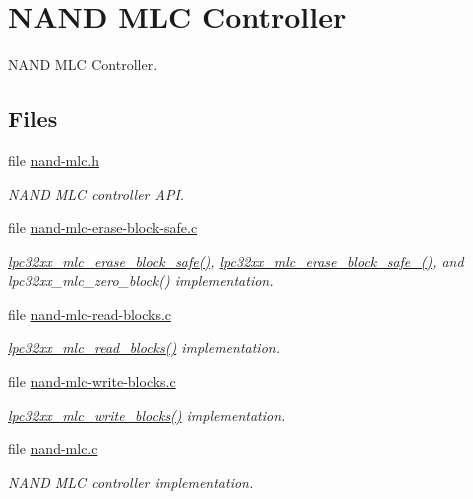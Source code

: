 \hypertarget{group__lpc32xx__nand__mlc}{}\section{N\+A\+ND M\+LC Controller}
\label{group__lpc32xx__nand__mlc}


N\+A\+ND M\+LC Controller.  


\subsection*{Files}
\begin{DoxyCompactItemize}
\item 
file \mbox{\hyperlink{nand-mlc_8h}{nand-\/mlc.\+h}}
\begin{DoxyCompactList}\small\item\em N\+A\+ND M\+LC controller A\+PI. \end{DoxyCompactList}\item 
file \mbox{\hyperlink{nand-mlc-erase-block-safe_8c}{nand-\/mlc-\/erase-\/block-\/safe.\+c}}
\begin{DoxyCompactList}\small\item\em \mbox{\hyperlink{group__lpc32xx__nand__mlc_gab3b2378535527c368dd10f78a4eca68c}{lpc32xx\+\_\+mlc\+\_\+erase\+\_\+block\+\_\+safe()}}, \mbox{\hyperlink{group__lpc32xx__nand__mlc_gab7abd0702699aa8db9c2acb4eb55258c}{lpc32xx\+\_\+mlc\+\_\+erase\+\_\+block\+\_\+safe\+\_()}}, and lpc32xx\+\_\+mlc\+\_\+zero\+\_\+block() implementation. \end{DoxyCompactList}\item 
file \mbox{\hyperlink{nand-mlc-read-blocks_8c}{nand-\/mlc-\/read-\/blocks.\+c}}
\begin{DoxyCompactList}\small\item\em \mbox{\hyperlink{group__lpc32xx__nand__mlc_ga2d5f41c8abd5910ad853e7ba096c9f7b}{lpc32xx\+\_\+mlc\+\_\+read\+\_\+blocks()}} implementation. \end{DoxyCompactList}\item 
file \mbox{\hyperlink{nand-mlc-write-blocks_8c}{nand-\/mlc-\/write-\/blocks.\+c}}
\begin{DoxyCompactList}\small\item\em \mbox{\hyperlink{group__lpc32xx__nand__mlc_gafa7ec91e1dfa52e3bcc614f4a9a66ab2}{lpc32xx\+\_\+mlc\+\_\+write\+\_\+blocks()}} implementation. \end{DoxyCompactList}\item 
file \mbox{\hyperlink{nand-mlc_8c}{nand-\/mlc.\+c}}
\begin{DoxyCompactList}\small\item\em N\+A\+ND M\+LC controller implementation. \end{DoxyCompactList}\end{DoxyCompactItemize}
